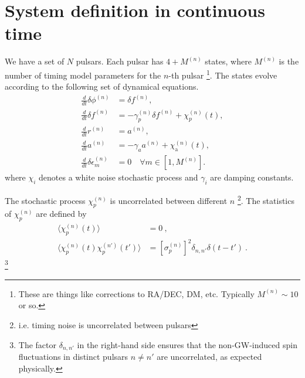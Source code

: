 \documentclass{tufte-handout} %
\begin{document}
\section{System definition in continuous time}\label{sec:continuous_time_system}
We have a set of $N$ pulsars. Each pulsar has $4 + M^{(n)}$ states, where $M^{(n)}$ is the number of timing model parameters for the $n$-th pulsar \footnote{These are things like corrections to RA/DEC, DM, etc. Typically $M^{(n)} \sim 10$ or so.}. The states evolve according to the following set of dynamical equations.
\begin{align}
	\frac{d}{dt} \delta \phi^{(n)} &= \delta f^{(n)}, \\
	\frac{d}{dt} \delta f^{(n)} &= -\gamma_p^{(n)} \delta f^{(n)} + \chi_p^{(n)}(t), \\
	\frac{d}{dt} r^{(n)} &= a^{(n)}, \\
	\frac{d}{dt} a^{(n)} &= -\gamma_a a^{(n)} + \chi_{\mathrm a}^{(n)}(t), \\
	\frac{d}{dt} \delta \epsilon^{(n)}_{m} &= 0 \quad \forall m \in [1, M^{(n)}].
\end{align}
where $\chi_{i}$ denotes a white noise stochastic process and $\gamma_i$ are damping constants. \newline 

The stochastic process  $\chi_p^{(n)}$ is uncorrelated between different $n$ \footnote{i.e. timing noise is uncorrelated between pulsars}. The statistics of $\chi_p^{(n)}$ are defined by
\begin{align}
	\langle \chi_p^{(n)}(t) \rangle &= 0 \ , \\
	\langle \chi_p^{(n)}(t) \chi_p^{(n')}(t') \rangle &= [\sigma_p^{(n)}]^2 \delta_{n,n'} \delta(t - t') \ .
\end{align}
\footnote{The factor $\delta_{n,n'}$ in the right-hand side ensures that the non-GW-induced spin fluctuations in distinct pulsars $n\neq n'$ are uncorrelated, as expected physically.}
\end{document}
